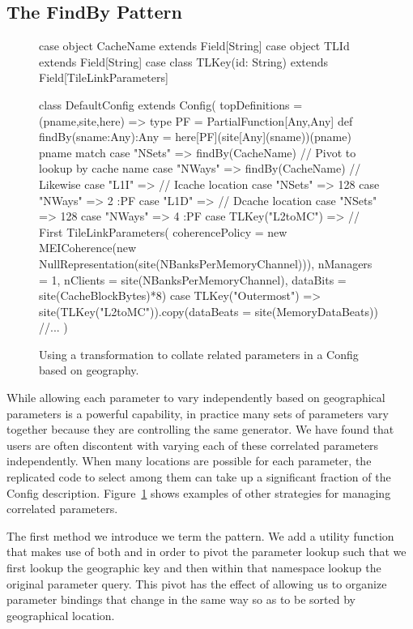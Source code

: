 \subsection{The FindBy Pattern}

\begin{figure}
\centering
\begin{scala}
case object CacheName extends Field[String]
case object TLId extends Field[String]
case class TLKey(id: String) extends Field[TileLinkParameters]

class DefaultConfig extends Config(
  topDefinitions = { (pname,site,here) =>
    type PF = PartialFunction[Any,Any]
    def findBy(sname:Any):Any = here[PF](site[Any](sname))(pname)
    pname match {
      case "NSets" => findBy(CacheName) // Pivot to lookup by cache name
      case "NWays" => findBy(CacheName) // Likewise
      case "L1I" => { // Icache location
        case "NSets" => 128
        case "NWays" => 2
      }:PF
      case "L1D" => { // Dcache location
        case "NSets" => 128
        case "NWays" => 4
      }:PF
      case TLKey("L2toMC") => // First
        TileLinkParameters(
          coherencePolicy = new MEICoherence(new NullRepresentation(site(NBanksPerMemoryChannel))),
          nManagers = 1,
          nClients = site(NBanksPerMemoryChannel),
          dataBits = site(CacheBlockBytes)*8)
      case TLKey("Outermost") => site(TLKey("L2toMC")).copy(dataBeats = site(MemoryDataBeats))
      //...
    }
  }
)
\end{scala} 
\caption{Using a transformation to collate related parameters in a Config based on geography.}
\label{fig:findby}
\end{figure}

While allowing each parameter to vary independently based on geographical parameters is a powerful capability,
in practice many sets of parameters vary together because they are controlling the same generator.
We have found that users are often discontent with varying each of these correlated parameters independently.
When many locations are possible for each parameter, the replicated code to select among them can
take up a significant fraction of the Config description. 
Figure~\ref{fig:findby} shows examples of other strategies for managing correlated parameters.

The first method we introduce we term the  pattern. We add a utility function that
makes use of both  and  in order to pivot the parameter lookup such that we first lookup
the geographic key and then within that namespace lookup the original parameter query.
This pivot has the effect of allowing us to organize parameter bindings that change in the same way
so as to be sorted by geographical location.

